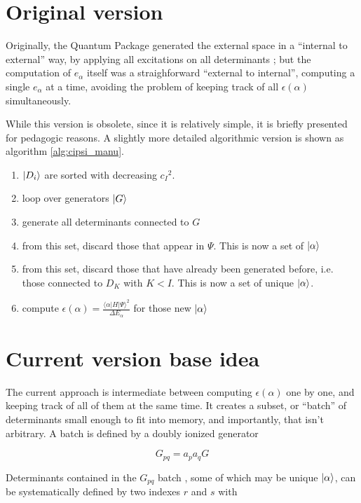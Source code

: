 \documentclass[./thesis.tex]{subfiles}
\begin{document}
\section{Original version}

Originally, the Quantum Package generated the external space in a ``internal to external'' way, by applying all excitations on all determinants ; but the computation of $e_\alpha$ itself was a straighforward ``external to internal'', computing a single $e_\alpha$ at a time, avoiding the problem of keeping track of all $\epsilon(\alpha)$ simultaneously.

While this version is obsolete, since it is relatively simple, it is briefly presented for pedagogic reasons. A slightly more detailed algorithmic version is shown as algorithm \ref{alg:cipsi_manu}.

\begin{enumerate}
\item
$\ket {D_i}$ are sorted with decreasing ${c_I}^2$.
\item
loop over generators $\ket G$
\item
generate all determinants connected to $G$
\item
from this set, discard those that appear in $\Psi$. This is now a set of $\ket \alpha$
\item
from this set, discard those that have already been generated before, i.e. those connected to $D_K$ with $K<I$. This is now a set of unique $\ket \alpha$.
\item
compute $\epsilon(\alpha) = \frac{\langle \alpha|H|\Psi\rangle^2}{\Delta E_\alpha}$ for those new $\ket \alpha$
\end{enumerate}


\section{Current version base idea}

The current approach is intermediate between computing $\epsilon(\alpha)$ one by one, and keeping track of all of them at the same time.
It creates a subset, or ``batch'' of determinants small enough to fit into memory, and importantly, that isn't arbitrary.
A batch is defined by a doubly ionized generator


\begin{equation}
G_{pq} = a_p a_q G
\end{equation}



Determinants contained in the $G_{pq}$ batch , some of which may be unique $\ket \alpha$, can be systematically defined by two indexes $r$ and $s$ with
\end{document}

